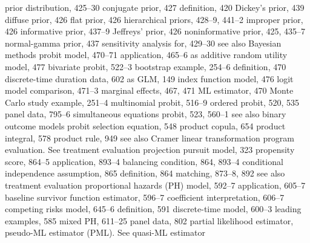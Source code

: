 prior distribution, 425–30 conjugate prior, 427 definition, 420 Dickey’s prior, 439 diffuse prior, 426
flat prior, 426
hierarchical priors, 428–9, 441–2 improper prior, 426
informative prior, 437–9 Jeffreys’ prior, 426 noninformative prior, 425, 435–7 normal-gamma prior, 437 sensitivity analysis for, 429–30 see also Bayesian methods
probit model, 470–71
application, 465–6
as additive random utility model, 477 bivariate probit, 522–3
bootstrap example, 254–6
definition, 470
discrete-time duration data, 602
as GLM, 149
index function model, 476
logit model comparison, 471–3
marginal effects, 467, 471
ML estimator, 470
Monte Carlo study example, 251–4 multinomial probit, 516–9
ordered probit, 520, 535
panel data, 795–6
simultaneous equations probit, 523, 560–1 see also binary outcome models
probit selection equation, 548 product copula, 654
product integral, 578
product rule, 949
see also Cramer linear transformation program evaluation. See treatment evaluation projection pursuit model, 323
propensity score, 864–5
application, 893–4
balancing condition, 864, 893–4 conditional independence assumption, 865 definition, 864
matching, 873–8, 892
see also treatment evaluation
proportional hazards (PH) model, 592–7 application, 605–7
baseline survivor function estimator, 596–7 coefficient interpretation, 606–7
competing risks model, 645–6 definition, 591
discrete-time model, 600–3 leading examples, 585
mixed PH, 611–25
panel data, 802
partial likelihood estimator, 
pseudo-ML estimator (PML). See quasi-ML estimator

